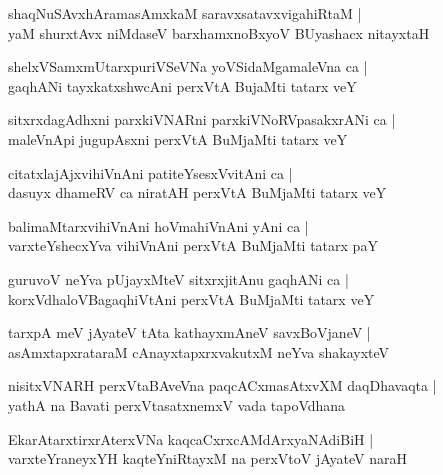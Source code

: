 \begin{shloka}
shaqNuSAvxhAramasAmxkaM saravxsatavxvigahiRtaM |\\
yaM shurxtAvx niMdaseV barxhamxnoBxyoV BUyashacx nitayxtaH
\end{shloka}

\begin{shloka}
shelxVSamxmUtarxpuriVSeVNa yoVSidaMgamaleVna ca |\\
gaqhANi tayxkatxshwcAni perxVtA BujaMti tatarx veY
\end{shloka}

\begin{shloka}
sitxrxdagAdhxni parxkiVNARni parxkiVNoRVpasakxrANi ca |\\
maleVnApi jugupAsxni perxVtA BuMjaMti tatarx veY
\end{shloka}

\begin{shloka}
citatxlajAjxvihiVnAni patiteYsesxVvitAni ca |\\
dasuyx dhameRV ca niratAH perxVtA BuMjaMti tatarx veY
\end{shloka}

\begin{shloka}
balimaMtarxvihiVnAni hoVmahiVnAni yAni ca |\\
varxteYshecxYva vihiVnAni perxVtA BuMjaMti tatarx paY
\end{shloka}

\begin{shloka}
guruvoV neYva pUjayxMteV sitxrxjitAnu gaqhANi ca |\\
korxVdhaloVBagaqhiVtAni perxVtA BuMjaMti tatarx veY
\end{shloka}

\begin{shloka}
tarxpA meV jAyateV tAta kathayxmAneV savxBoVjaneV |\\
asAmxtapxrataraM cAnayxtapxrxvakutxM neYva shakayxteV
\end{shloka}

\begin{shloka}
nisitxVNARH perxVtaBAveVna paqcACxmasAtxvXM daqDhavaqta |\\
yathA na Bavati perxVtasatxnemxV vada tapoVdhana
\end{shloka}

\begin{shloka}
EkarAtarxtirxrAterxVNa kaqcaCxrxcAMdArxyaNAdiBiH |\\
varxteYraneyxYH kaqteYniRtayxM na perxVtoV jAyateV naraH
\end{shloka}


